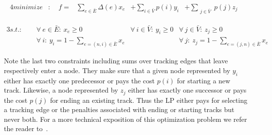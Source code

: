 		\begin{alignat*}{4}
		minimize & : & \ \ f = &\sum_{ e \in \bar{E} } \Delta(e) x_{e}  &+  \sum_{ i \in \bar{V}} p(i) y_{i} & +   \sum_{ \substack{j \in \bar{V}}} p(j) z_{j} &  
		\end{alignat*}

		\begin{alignat*}{3}
		  s.t.:
		        & \ \     & \forall \ e \in \bar{E} : \ x_{e} \ge 0  \quad \quad    & \forall \ i \in \bar{V} : \ y_{i} \ge 0                                          & \forall \ j \in \bar{V} : \ z_{j} \ge 0                                             \\
		        & \ \     & \forall \ i: \ y_{i} = 1 - \sum_{e = (n,i) \in \bar{E}} x_{e}                                          &                                                     & \forall \ j: \ z_{j} = 1 - \sum_{e = (j,n) \in \bar{E}} x_{e}                     
		\end{alignat*}

		Note the last two constraints including sums over tracking edges that leave respectively enter a node. They make sure that a given node represented by $y_i$ either has exactly one predecessor or pays the cost $p(i)$ for starting a new track. Likewise, a node represented by $z_j$ either has exactly one successor or pays the cost $p(j)$ for ending an existing track. Thus the LP either pays for selecting a tracking edge or the penalties associated with ending or starting tracks but never both. For a more technical exposition of this optimization problem we refer the reader to~\cite{Karrenbauer2013}.

